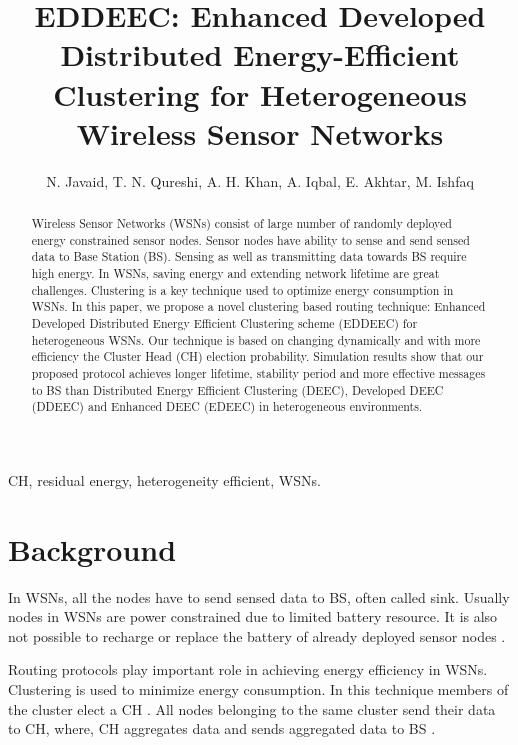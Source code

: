 \documentclass[3p,times,procedia]{elsarticle}
\begin{document}
\begin{frontmatter}
\title{EDDEEC: Enhanced Developed Distributed Energy-Efficient\\ Clustering for Heterogeneous Wireless Sensor Networks}

\author{N. Javaid, T. N. Qureshi, A. H. Khan, A. Iqbal, E. Akhtar, M. Ishfaq}

\address{COMSATS Institute of Information Technology, Islamabad, Pakistan. \\
        University of Bedfordshire, Luton, UK.\\
        King Abdulaziz University, Rabigh, Saudi Arabia.}

\begin{abstract}
Wireless Sensor Networks (WSNs) consist of large number of randomly deployed energy constrained sensor nodes. Sensor nodes have ability to sense and send sensed data to Base Station (BS). Sensing as well as transmitting data towards BS require high energy. In WSNs, saving energy and extending network lifetime are great challenges. Clustering is a key technique used to optimize energy consumption in WSNs. In this paper, we propose a novel clustering based routing technique: Enhanced Developed Distributed Energy Efficient Clustering scheme (EDDEEC) for heterogeneous WSNs. Our technique is based on changing dynamically and with more efficiency the Cluster Head (CH) election probability. Simulation results show that our proposed protocol achieves longer lifetime, stability period and more effective messages to BS than Distributed Energy Efficient Clustering (DEEC), Developed DEEC (DDEEC) and Enhanced DEEC (EDEEC) in heterogeneous environments.
\end{abstract}
\begin{keyword}
CH, residual energy, heterogeneity efficient, WSNs.
\end{keyword}
\end{frontmatter}
\section{Background}
In WSNs, all the nodes have to send sensed data to BS, often called sink. Usually nodes in WSNs are power constrained due to limited battery resource. It is also not possible to recharge or replace the battery of already deployed sensor nodes \cite{talha,talha 1, Reference 1}.

Routing protocols play important role in achieving energy efficiency in WSNs. Clustering is used to minimize energy consumption. In this technique members of the cluster elect a CH \cite{Reference 2,Reference 3}. All nodes belonging to the same cluster send their data to CH, where, CH aggregates data and sends aggregated data to BS \cite{Reference 4,Reference 5,Reference 6}.
\end{document}
